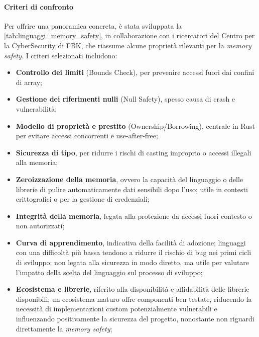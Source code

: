 \paragraph{Criteri di confronto}
Per offrire una panoramica concreta, è stata sviluppata la \autoref{tab:linguaggi_memory_safety},
in collaborazione con i ricercatori del Centro per la CyberSecurity di FBK\footnotemark,
che riassume alcune proprietà rilevanti per la \textit{memory safety}. I criteri
selezionati includono:
\begin{itemize}
  \item \textbf{Controllo dei limiti} (Bounds Check), per prevenire accessi fuori
    dai confini di array;

  \item \textbf{Gestione dei riferimenti nulli} (Null Safety), spesso causa di crash
    e vulnerabilità;

  \item \textbf{Modello di proprietà e prestito} (Ownership/Borrowing), centrale
    in Rust per evitare accessi concorrenti e use-after-free;

  \item \textbf{Sicurezza di tipo}, per ridurre i rischi di casting improprio o accessi
    illegali alla memoria;

  \item \textbf{Zeroizzazione della memoria}, ovvero la capacità del linguaggio o
    delle librerie di pulire automaticamente dati sensibili dopo l'uso; utile in
    contesti crittografici o per la gestione di credenziali;

  \item \textbf{Integrità della memoria}, legata alla protezione da accessi fuori
    contesto o non autorizzati;

  \item \textbf{Curva di apprendimento}, indicativa della facilità di adozione;
    linguaggi con una difficoltà più bassa tendono a ridurre il rischio di bug
    nei primi cicli di sviluppo; non legata alla sicurezza in modo diretto, ma
    utile per valutare l'impatto della scelta del linguaggio sul processo di
    sviluppo;

  \item \textbf{Ecosistema e librerie}, riferito alla disponibilità e affidabilità
    delle librerie disponibili; un ecosistema maturo offre componenti ben
    testate, riducendo la necessità di implementazioni custom potenzialmente vulnerabili
    e influenzando positivamente la sicurezza del progetto, nonostante non
    riguardi direttamente la \textit{memory safety};
\end{itemize}

